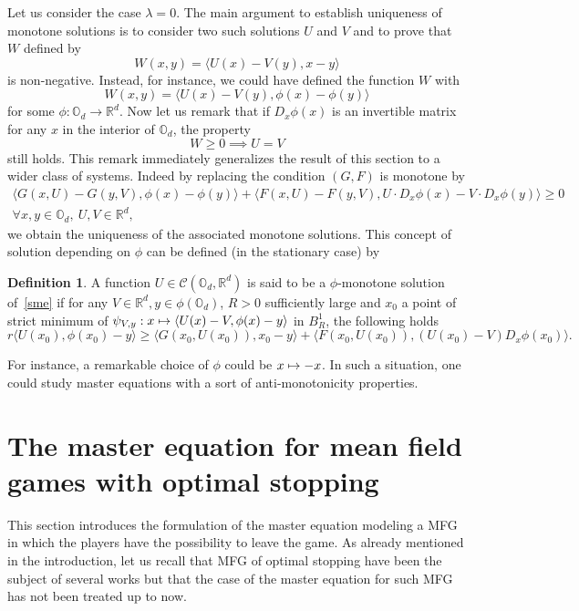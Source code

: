 \documentclass[JEP,XML,SOM,Unicode,NoEqCountersInSection,published]{cedram}
\let\mathcal\mathscr
\newcommand\mto{\mathchoice{\longmapsto}{\mapsto}{\mapsto}{\mapsto}}
\theoremstyle{definition}
\newtheorem{Def}{Definition}[section]
\begin{document}
Let us consider the case $\lambda = 0$. The main argument to establish uniqueness of monotone solutions is to consider two such solutions $U$ and $V$ and to prove that $W$ defined by
\begin{equation*}
W(x,y) = \langle U(x)-V(y), x-y\rangle
\end{equation*}
is non-negative. Instead, for instance, we could have defined the function $W$ with
\begin{equation*}
W(x,y) = \langle U(x)-V(y), \phi(x)-\phi(y)\rangle
\end{equation*}
for some $\phi: \mathbb{O}_d \to \mathbb{R}^d$. Now let us remark that if $D_x\phi(x)$ is an invertible matrix for any $x$ in the interior of $\mathbb{O}_d$, the property
\begin{equation*}
W \geq 0 \implies U = V
\end{equation*}
still holds. This remark immediately generalizes the result of this section to a wider class of systems. Indeed by replacing the condition $(G,F)$ is monotone by
\begin{multline*}
\langle G(x,U)-G(y,V), \phi(x)-\phi(y) \rangle+\langle F(x,U)-F(y,V), U\cdot D_x \phi(x)-V\cdot D_x \phi(y) \rangle \geq 0\\  \forall x,y \in \mathbb{O}_d,\ U,V \in \mathbb{R}^d,
\end{multline*}
we obtain the uniqueness of the associated monotone solutions. This concept of solution depending on $\phi$ can be defined (in the stationary case) by
\begin{Def}\label{defmongen}
A function $U \in \mathcal{C}(\mathbb{O}_d, \mathbb{R}^d)$ is said to be a $\phi$-monotone solution of~\eqref{sme} if for any $V \in \mathbb{R}^d, y \in \phi(\mathbb{O}_d)$, $R>0$ sufficiently large and $x_0$ a point of strict minimum of $\psi_{V,y}: x \mto \langle U(x)-V, \phi(x)-y\rangle$ in $B^1_R$, the following holds
\[
r\langle U(x_0), \phi(x_0)-y\rangle \geq \langle G(x_0, U(x_0)), x_0-y\rangle+\langle F(x_0,U(x_0)), (U(x_0)- V)D_x\phi(x_0) \rangle.
\]
\end{Def}
For instance, a remarkable choice of $\phi$ could be $x \mto-x$. In such a situation, one could study master equations with a sort of anti-monotonicity properties.

\section{The master equation for mean field games with optimal stopping}\label{sectstop}
This section introduces the formulation of the master equation modeling a MFG in which the players have the possibility to leave the game. As already mentioned in the introduction, let us recall that MFG of optimal stopping have been the subject of several works but that the case of the master equation for such MFG has not been treated up to now.
\end{document}
